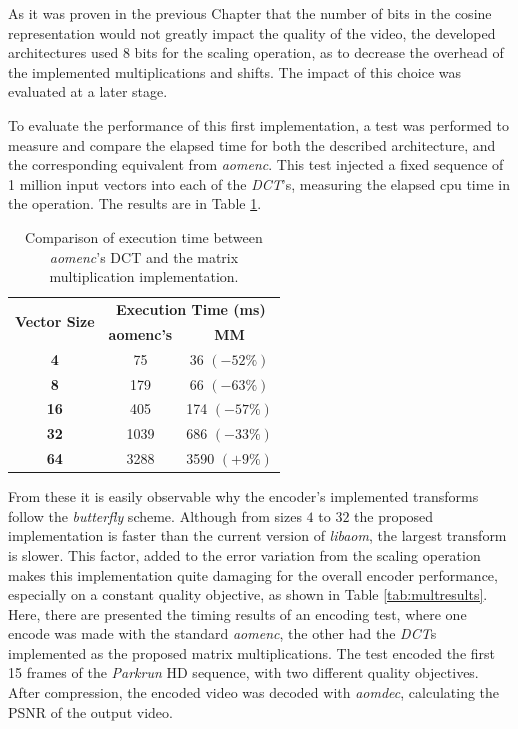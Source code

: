 As it was proven in the previous Chapter that the number of bits in the cosine representation would not greatly impact the quality of the video, the developed architectures used 8 bits for the scaling operation, as to decrease the overhead of the implemented multiplications and shifts. The impact of this choice was evaluated at a later stage.

To evaluate the performance of this first implementation, a test was performed to measure and compare the elapsed time for both the described architecture, and the corresponding equivalent from \emph{aomenc}. This test injected a fixed sequence of 1 million input vectors into each of the \emph{DCT}'s,  measuring the elapsed cpu time in the operation. The results are in Table \ref{tab:dcttime}.

\begin{table}[!htpb]
    \centering
    \caption{Comparison of execution time between \emph{aomenc}'s DCT and the matrix multiplication implementation.}
    \begin{tabular}{ccc} \toprule
        \multirow{2}{*}{\textbf{Vector Size}} &     \multicolumn{2}{c}{\textbf{Execution Time (ms)}} \\
         &      \textbf{aomenc's} &      \textbf{MM} \\ \toprule
        \textbf{4} &    75 &       36 $(-52\%)$ \\ \hline
        \textbf{8} &    179 &      66 $(-63\%)$ \\ \hline
        \textbf{16} &   405 &      174 $(-57\%)$ \\ \hline
        \textbf{32} &   1039 &     686 $(-33\%)$  \\ \hline
        \textbf{64} &   3288 &     3590 $(+9\%)$  \\ 
        \bottomrule
    \end{tabular}    
    \label{tab:dcttime}
\end{table}

From these it is easily observable why the encoder's implemented transforms follow the \emph{butterfly} scheme. Although from sizes $4$ to $32$ the proposed     implementation is faster than the current version of \emph{libaom}, the largest transform is slower. This factor, added to the error variation from the scaling operation makes this implementation quite damaging for the overall encoder performance, especially on a constant quality objective, as shown in Table \ref{tab:multresults}. Here, there are presented the timing results of an encoding test, where one encode was made with the standard \emph{aomenc}, the other had the \emph{DCT}s implemented as the proposed matrix multiplications. The test encoded the first 15 frames of the \emph{Parkrun} HD sequence, with two different quality objectives. After compression, the encoded video was decoded with \emph{aomdec}, calculating the PSNR of the output video.

